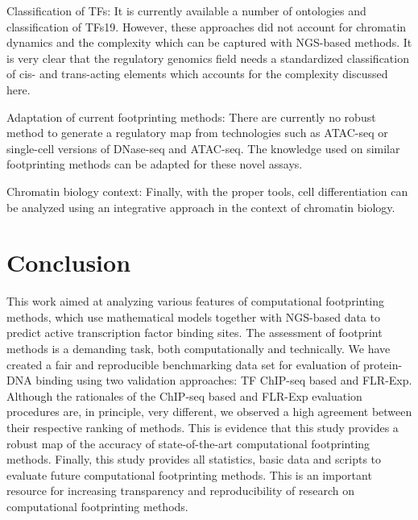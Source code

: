 Classification of TFs: It is currently available a number of ontologies and classification of TFs19. However, these approaches did not account for chromatin dynamics and the complexity which can be captured with NGS-based methods. It is very clear that the regulatory genomics field needs a standardized classification of cis- and trans-acting elements which accounts for the complexity discussed here.

Adaptation of current footprinting methods: There are currently no robust method to generate a regulatory map from technologies such as ATAC-seq or single-cell versions of DNase-seq and ATAC-seq. The knowledge used on similar footprinting methods can be adapted for these novel assays.

Chromatin biology context: Finally, with the proper tools, cell differentiation can be analyzed using an integrative approach in the context of chromatin biology.

\section{Conclusion}
\label{sec:conclusion.6}

This work aimed at analyzing various features of computational footprinting methods, which use mathematical models together with NGS-based data to predict active transcription factor binding sites. The assessment of footprint methods is a demanding task, both computationally and technically. We have created a fair and reproducible benchmarking data set for evaluation of protein-DNA binding using two validation approaches: TF ChIP-seq based and FLR-Exp. Although the rationales of the ChIP-seq based and FLR-Exp evaluation procedures are, in principle, very different, we observed a high agreement between their respective ranking of methods. This is evidence that this study provides a robust map of the accuracy of state-of-the-art computational footprinting methods. Finally, this study provides all statistics, basic data and scripts to evaluate future computational footprinting methods. This is an important resource for increasing transparency and reproducibility of research on computational footprinting methods.


